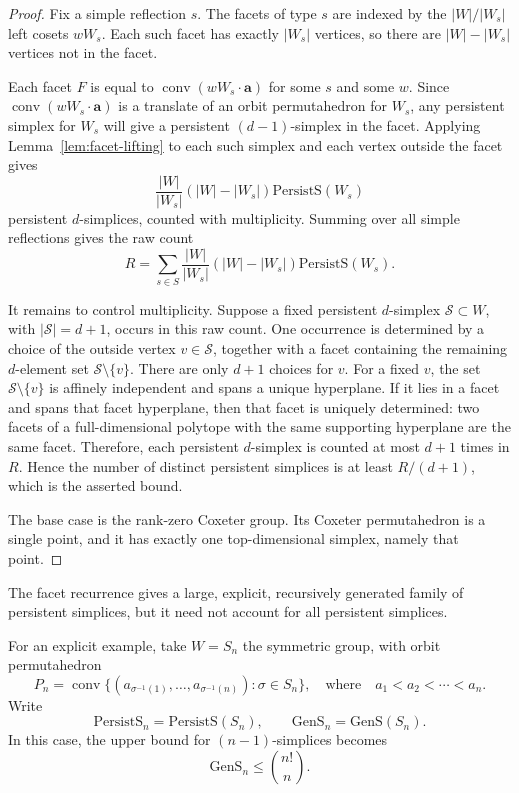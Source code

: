 \documentclass{amsart}
\theoremstyle{definition}
\def\ba{\mathbf{a}}
\def\cS{\mathcal{S}}
\DeclareMathOperator{\conv}{conv}
\def\gsimp{\mathrm{GenS}}
\def\psimp{\mathrm{PersistS}}
\begin{document}
\begin{proof}
Fix a simple reflection $s$. The facets of type \(s\) are indexed by the \(|W|/|W_s|\) left
cosets \(wW_s\). Each such facet has exactly \(|W_s|\) vertices, so there are \(|W|-|W_s|\) vertices not in the facet.

Each facet \(F\) is equal to $\conv(wW_s \cdot\ba)$ for some $s$ and some $w$. Since $\conv(wW_s \cdot\ba)$ is a translate of an orbit permutahedron for $W_s$, any persistent simplex for $W_s$ will give a persistent \((d-1)\)-simplex in the facet.
Applying Lemma~\ref{lem:facet-lifting}
to each such simplex and each vertex outside the facet gives
\[
\frac{|W|}{|W_s|}\left(|W|-|W_s|\right)\psimp(W_s)
\]
persistent \(d\)-simplices, counted with multiplicity. Summing over
all simple reflections gives the raw count
\[
R=
\sum_{s\in S}
\frac{|W|}{|W_{s}|}
\left(|W|-|W_{s}|\right)\psimp(W_{s}).
\]

It remains to control multiplicity. Suppose a fixed persistent \(d\)-simplex
\(\cS\subset W\), with \(|\cS|=d+1\), occurs in this raw count. One occurrence is
determined by a choice of the outside vertex \(v\in \cS\), together with a facet
containing the remaining \(d\)-element set \(\cS\setminus\{v\}\). There are only
\(d+1\) choices for \(v\). For a fixed \(v\), the set \(\cS\setminus\{v\}\) is
affinely independent and spans a unique hyperplane. If it lies in a facet and
spans that facet hyperplane, then that facet is uniquely determined: two
facets of a full-dimensional polytope with the same supporting hyperplane are
the same facet. Therefore, each persistent \(d\)-simplex is counted at most
\(d+1\) times in \(R\). Hence the number of distinct persistent
simplices is at least \(R/(d+1)\), which is the asserted bound.

The base case is the rank-zero Coxeter group. Its Coxeter permutahedron is a
single point, and it has exactly one top-dimensional simplex, namely that
point.
\end{proof}

The facet recurrence gives a large, explicit, recursively generated family of
persistent simplices, but it need not account for all persistent simplices.


For an explicit example, take \(W=S_n\) the symmetric group, with orbit permutahedron
\[
P_n
=
\conv\{(a_{\sigma^{-1}(1)},\dots,a_{\sigma^{-1}(n)}):\sigma\in S_n\},
\quad \text{where} \quad
a_1<a_2<\cdots<a_n.
\]
Write 
\[
\psimp_n=\psimp(S_n),
\qquad
\gsimp_n=\gsimp(S_n).
\]
In this case, the upper bound for \((n-1)\)-simplices becomes
\[
\gsimp_n
\le
\binom{n!}{n}.
\]
\end{document}
